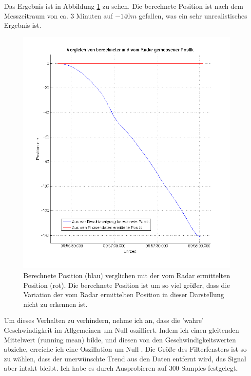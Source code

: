 \documentclass[12pt,a4paper,twoside,BCOR=12.5mm]{scrartcl}
\begin{document}
Das Ergebnis ist in Abbildung \ref{riesenfehler} zu sehen. Die berechnete Position ist nach dem Messzeitraum von ca. 3 Minuten auf $-140m$ gefallen, was ein sehr unrealistisches Ergebnis ist.

 \begin{figure}[htb]
\centering
\includegraphics[scale=.5]{geoauswertung/riesenfehler.png}
\caption{Berechnete Position (blau) verglichen mit der vom Radar ermittelten Position (rot). Die berechnete Position ist um so viel größer, dass die Variation der vom Radar ermittelten Position in dieser Darstellung nicht zu erkennen ist.}
\label{riesenfehler}
\end{figure}

Um dieses Verhalten zu verhindern, nehme ich an, dass die 'wahre' Geschwindigkeit im Allgemeinen um Null oszilliert. 
Indem ich einen gleitenden Mittelwert (running mean) bilde, und diesen von den Geschwindigkeitswerten abziehe, erreiche ich eine Oszillation um Null \citep[vlg.][]{Neitzel:2007vn}. Die Größe des Filterfensters ist so zu wählen, dass der unerwünschte Trend aus den Daten entfernt wird, das Signal aber intakt bleibt. Ich habe es durch Ausprobieren auf 300 Samples festgelegt. 
\end{document}

